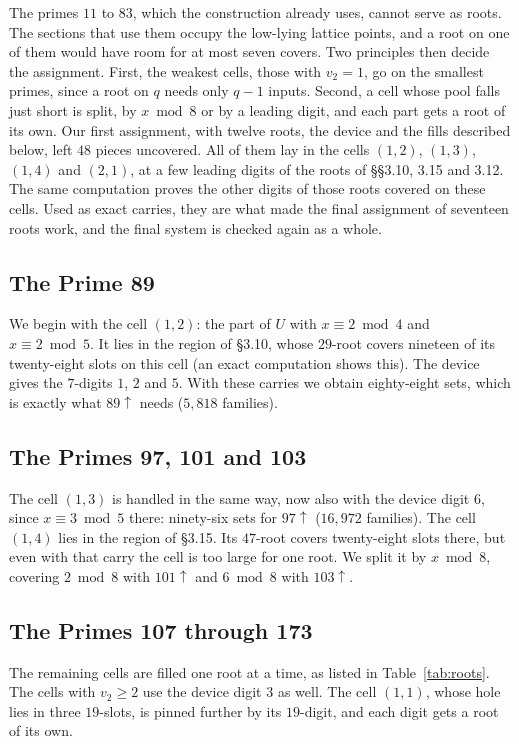 \documentclass[11pt]{amsart}
\theoremstyle{definition}
\theoremstyle{remark}
\newcommand{\up}{{\uparrow}}
\begin{document}
The primes $11$ to $83$, which the construction already uses, cannot serve as roots. The sections that use them
occupy the low-lying lattice points, and a root on one of them would have room for at most seven covers. Two
principles then decide the assignment. First, the weakest cells, those with $v_2=1$, go on the smallest primes,
since a root on $q$ needs only $q-1$ inputs. Second, a cell whose pool falls just short is split, by $x \bmod 8$ or
by a leading digit, and each part gets a root of its own. Our first assignment, with twelve roots, the device and the
fills described below, left $48$ pieces uncovered. All of them lay in the cells $(1,2)$, $(1,3)$, $(1,4)$ and
$(2,1)$, at a few leading digits of the roots of §§3.10, 3.15 and 3.12. The same computation proves the other digits
of those roots covered on these cells. Used as exact carries, they are what made the final assignment of seventeen
roots work, and the final system is checked again as a whole.

\subsection*{The Prime 89}
We begin with the cell $(1,2)$: the part of $U$ with $x\equiv2 \bmod 4$ and $x\equiv2 \bmod 5$. It lies in the
region of §3.10, whose $29$-root covers nineteen of its twenty-eight slots on this cell (an exact computation shows
this). The device gives the $7$-digits $1$, $2$ and $5$. With these carries we obtain eighty-eight sets, which is
exactly what $89\up$ needs ($5{,}818$ families).

\subsection*{The Primes 97, 101 and 103}
The cell $(1,3)$ is handled in the same way, now also with the device digit $6$, since $x\equiv3 \bmod 5$ there:
ninety-six sets for $97\up$ ($16{,}972$ families). The cell $(1,4)$ lies in the region of §3.15. Its $47$-root covers
twenty-eight slots there, but even with that carry the cell is too large for one root. We split it by $x \bmod 8$,
covering $2 \bmod 8$ with $101\up$ and $6 \bmod 8$ with $103\up$.

\subsection*{The Primes 107 through 173}
The remaining cells are filled one root at a time, as listed in Table~\ref{tab:roots}. The cells with $v_2\ge2$ use the
device digit $3$ as well. The cell $(1,1)$, whose hole lies in three $19$-slots, is pinned further by its $19$-digit,
and each digit gets a root of its own.
\end{document}
